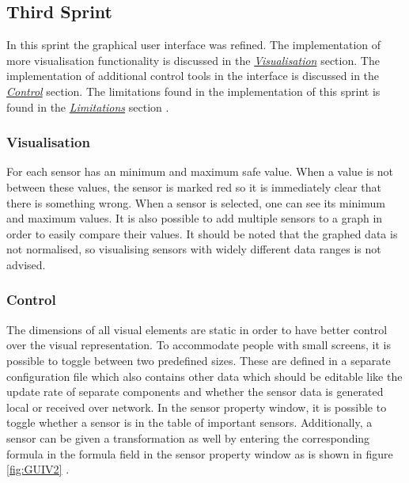 \subsection{Third Sprint}
In this sprint the graphical user interface was refined. The implementation of more visualisation functionality is discussed in the \hyperref[sec:VisS3]{\textit{Visualisation}} section. The implementation of additional control tools in the interface is discussed in the \hyperref[sec:ConS3]{\textit{Control}} section. The limitations found in the implementation of this sprint is found in the \hyperref[sec:LimS3]{\textit{Limitations}} section .
\subsubsection{Visualisation}
\label{sec:VisS3}
For each sensor has an minimum and maximum safe value. When a value is not between these values, the sensor is marked red so it is immediately clear that there is something wrong. When a sensor is selected, one can see its minimum and maximum values. It is also possible to add multiple sensors to a graph in order to easily compare their values. It should be noted that the graphed data is not normalised, so visualising sensors with widely different data ranges is not advised.  

\subsubsection{Control}
\label{sec:ConS3}
The dimensions of all visual elements are static in order to have better control over the visual representation. To accommodate people with small screens, it is possible to toggle between two predefined sizes. These are defined in a separate configuration file which also contains other data which should be editable like the update rate of separate components and whether the sensor data is generated local or received over network. In the sensor property window, it is possible to toggle whether a sensor is in the table of important sensors. Additionally, a sensor can be given a transformation as well by entering the corresponding formula in the formula field in the sensor property window as is shown in figure \ref{fig:GUIV2} . 


